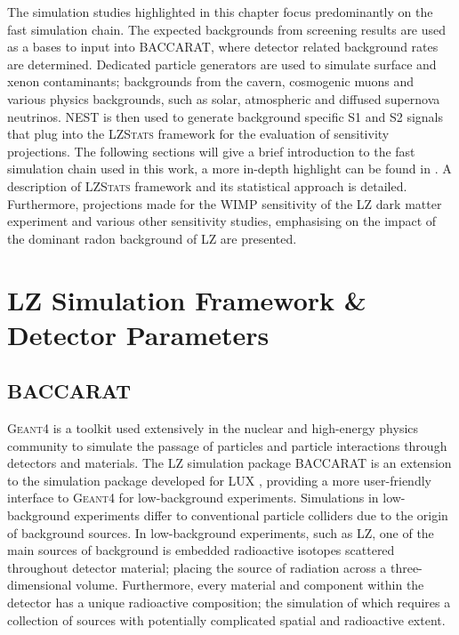 The simulation studies highlighted in this chapter focus predominantly on the fast simulation chain. The expected backgrounds from screening results are used as a bases to input into \textsc{BACCARAT}, where detector related background rates are determined. Dedicated particle generators are used to simulate surface and xenon contaminants; backgrounds from the cavern, cosmogenic muons and various physics backgrounds, such as solar, atmospheric and diffused supernova neutrinos. NEST is then used to generate background specific S1 and S2 signals that plug into the \textsc{LZStats} framework for the evaluation of sensitivity projections. The following sections will give a brief introduction to the fast simulation chain used in this work, a more in-depth highlight can be found in \cite{lz_simulations}. A description of \textsc{LZStats} framework and its statistical approach is detailed. Furthermore, projections made for the WIMP sensitivity of the LZ dark matter experiment and various other sensitivity studies, emphasising on the impact of the dominant radon background of LZ are presented.


\section{LZ Simulation Framework \& Detector Parameters}
\label{sec:LZ_simulation_framework}


\subsection{BACCARAT}
\label{secsec:BACCARAT}

\textsc{Geant4} is a toolkit used extensively in the nuclear and high-energy physics community to simulate the passage of particles and particle interactions through detectors and materials. The LZ simulation package \textsc{BACCARAT} is an extension to the simulation package developed for LUX \cite{AKERIB201263}, providing a more user-friendly interface to \textsc{Geant4} for low-background experiments. Simulations in low-background experiments differ to conventional particle colliders due to the origin of background sources. In low-background experiments, such as LZ, one of the main sources of background is embedded radioactive isotopes scattered throughout detector material; placing the source of radiation across a three-dimensional volume. Furthermore, every material and component within the detector has a unique radioactive composition; the simulation of which requires a collection of sources with potentially complicated spatial and radioactive extent.

